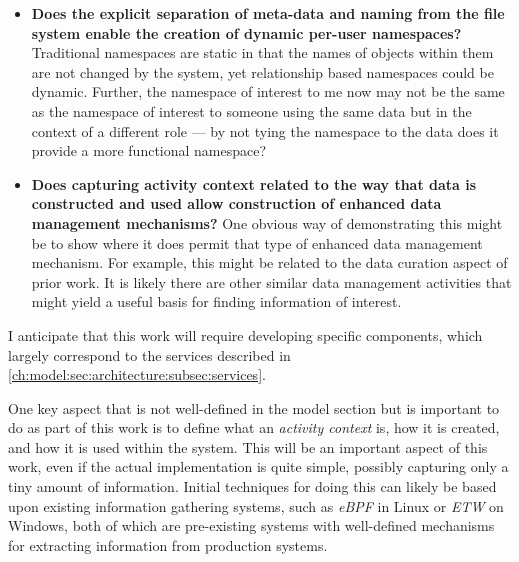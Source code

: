\begin{itemize}
    \item \textbf{Does the explicit separation of meta-data and naming from the file
              system enable the creation of dynamic per-user name\-spaces?} Traditional
          name\-spaces are static in that the names of objects within them
          are not changed by the system, yet relationship based name\-spaces could be
          dynamic.  Further, the namespace of interest to me now may not be the same
          as the namespace of interest to someone using the same data but in the
          context of a different role --- by not tying the namespace to the data does
          it provide a more functional namespace?  

    \item \textbf{Does capturing activity context related to the way that data is
              constructed and used allow construction of enhanced data management
              mechanisms?} One obvious way of demonstrating this might be to show where it
          does permit that type of enhanced data management mechanism.  For example,
          this might be related to the data curation aspect of prior work. It is
          likely there are other similar data management activities that might yield a
          useful basis for finding information of interest.

\end{itemize}

I anticipate that this work will require developing specific components, which
largely correspond to the services described in
\autoref{ch:model:sec:architecture:subsec:services}.

One key aspect that is not well-defined in the model section but is
important to do as part of this work is to define what an \emph{activity
    context} is, how it is created, and how it is used within the system.  This will
be an important aspect of this work, even if the actual implementation is quite
simple, possibly capturing only a tiny amount of information.
Initial
techniques for doing this can likely be based upon existing information
gathering systems, such as \emph{eBPF} in Linux
or \emph{ETW} on Windows, both of which are
pre-existing systems with well-defined mechanisms for extracting information
from production systems.

